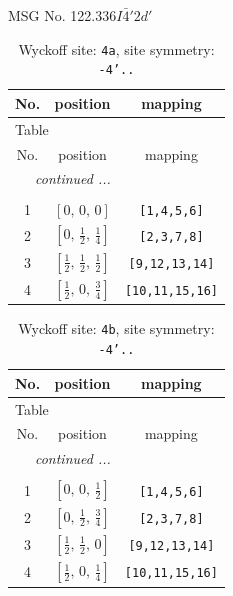 \documentclass[fleqn,8pt]{jsarticle}
\begin{document}
\setcounter{MaxMatrixCols}{32}

\renewcommand{\tablename}{Table~}
\renewcommand{\figurename}{Figure~}
\begin{center}
\LARGE
MSG No. 122.336\quad$I\bar{4}'2d'$
\end{center}
\renewcommand{\arraystretch}{1.2}
\begin{longtable}{ccc}
\caption{Wyckoff site: {\tt 4a}, site symmetry: {\tt -4'..}}
 \\
 \hline \hline
No. & position & mapping \\ \hline \endfirsthead

\multicolumn{2}{l}{\tablename\ \thetable{}} \\
 \hline \hline
No. & position & mapping \\ \hline \endhead

 \hline \hline
\multicolumn{2}{r}{\footnotesize\it continued ...} \\ \endfoot

 \hline \hline
\multicolumn{2}{r}{} \\ \endlastfoot

1 & $\left[ 0,\, 0,\, 0 \right]$ & {\tt [1,4,5,6]} \\ \hline
2 & $\left[ 0,\, \frac{1}{2},\, \frac{1}{4} \right]$ & {\tt [2,3,7,8]} \\ \hline
3 & $\left[ \frac{1}{2},\, \frac{1}{2},\, \frac{1}{2} \right]$ & {\tt [9,12,13,14]} \\ \hline
4 & $\left[ \frac{1}{2},\, 0,\, \frac{3}{4} \right]$ & {\tt [10,11,15,16]} \\
\end{longtable}
\renewcommand{\arraystretch}{1.2}
\begin{longtable}{ccc}
\caption{Wyckoff site: {\tt 4b}, site symmetry: {\tt -4'..}}
 \\
 \hline \hline
No. & position & mapping \\ \hline \endfirsthead

\multicolumn{2}{l}{\tablename\ \thetable{}} \\
 \hline \hline
No. & position & mapping \\ \hline \endhead

 \hline \hline
\multicolumn{2}{r}{\footnotesize\it continued ...} \\ \endfoot

 \hline \hline
\multicolumn{2}{r}{} \\ \endlastfoot

1 & $\left[ 0,\, 0,\, \frac{1}{2} \right]$ & {\tt [1,4,5,6]} \\ \hline
2 & $\left[ 0,\, \frac{1}{2},\, \frac{3}{4} \right]$ & {\tt [2,3,7,8]} \\ \hline
3 & $\left[ \frac{1}{2},\, \frac{1}{2},\, 0 \right]$ & {\tt [9,12,13,14]} \\ \hline
4 & $\left[ \frac{1}{2},\, 0,\, \frac{1}{4} \right]$ & {\tt [10,11,15,16]} \\
\end{longtable}
\end{document}
